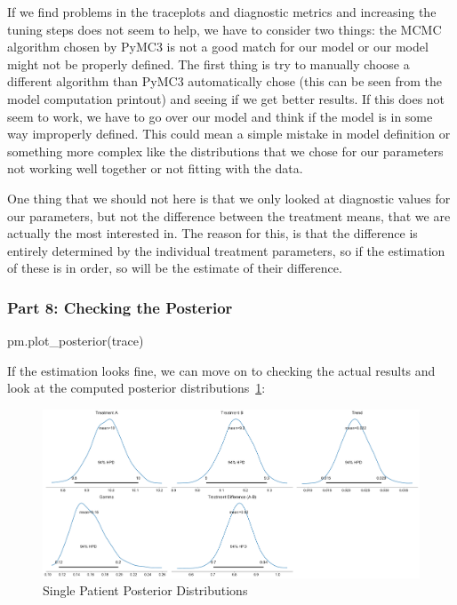 \documentclass[12pt,a4paper,leqno]{report}
\theoremstyle{plain}
\theoremstyle{definition}
\theoremstyle{remark}
\begin{document}
If we find problems in the traceplots and diagnostic metrics and increasing the tuning
steps does not seem to help, we have to consider two things: the
MCMC algorithm chosen by PyMC3 is not a good match for our model or our model might not
be properly defined. The first thing is try to manually choose a different algorithm than
PyMC3 automatically chose (this can be seen from the model computation printout) and seeing
if we get better results. If this does not seem to work, we have to go over our model and
think if the model is in some way improperly defined. This could mean a simple mistake
in model definition or something more complex like the distributions that we chose for
our parameters not working well together or not fitting with the data.

One thing that we should not here is that we only looked at diagnostic values for our
parameters, but not the difference between the treatment means, that we are actually the
most interested in. The reason for this, is that the difference is entirely determined
by the individual treatment parameters, so if the estimation of these is in order, so
will be the estimate of their difference.

\subsubsection*{Part 8: Checking the Posterior}

\bigskip
\begin{pyverbatim}[][fontsize=\footnotesize]
pm.plot_posterior(trace)
\end{pyverbatim}
\bigskip

If the estimation looks fine, we can move on to checking the actual results and look at
the computed posterior distributions\ \ref{singlepatientposteriors}:

\bigskip
\begin{figure}[H]
    \caption{Single Patient Posterior Distributions}\label{singlepatientposteriors}
    \bigskip
    \includegraphics[width=\textwidth,height=\textheight,keepaspectratio]{single_patient_posteriors.pdf}
\end{figure}
\bigskip
\end{document}
